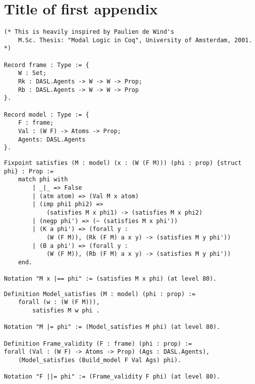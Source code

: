 \newpage
{}
\appendix

\chapter{Title of first appendix}
	\label{AP_01}

\begin{tcolorbox}
	\begin{lstlisting}[language=Coq]
(* This is heavily inspired by Paulien de Wind's 
	M.Sc. Thesis: "Modal Logic in Coq", University of Amsterdam, 2001.
*)
	
Record frame : Type := {
	W : Set;
	Rk : DASL.Agents -> W -> W -> Prop;
	Rb : DASL.Agents -> W -> W -> Prop
}.
	
Record model : Type := {
	F : frame;
	Val : (W F) -> Atoms -> Prop;
	Agents: DASL.Agents
}.
	\end{lstlisting}	

\end{tcolorbox}

\begin{tcolorbox}
	\begin{lstlisting}[language=Coq]
Fixpoint satisfies (M : model) (x : (W (F M))) (phi : prop) {struct phi} : Prop :=
	match phi with
		| _|_ => False
		| (atm atom) => (Val M x atom)
		| (imp phi1 phi2) => 
			(satisfies M x phi1) -> (satisfies M x phi2)
		| (negp phi') => (~ (satisfies M x phi'))
		| (K a phi') => (forall y : 
			(W (F M)), (Rk (F M) a x y) -> (satisfies M y phi'))
		| (B a phi') => (forall y :
			(W (F M)), (Rb (F M) a x y) -> (satisfies M y phi'))
	end.
		
Notation "M x |== phi" := (satisfies M x phi) (at level 80).
	\end{lstlisting}	

\end{tcolorbox}

\begin{tcolorbox}
\begin{lstlisting}[language=Coq]
Definition Model_satisfies (M : model) (phi : prop) := 
	forall (w : (W (F M))),
		satisfies M w phi .
		
Notation "M |= phi" := (Model_satisfies M phi) (at level 80).

Definition Frame_validity (F : frame) (phi : prop) := 
forall (Val : (W F) -> Atoms -> Prop) (Ags : DASL.Agents),
	(Model_satisfies (Build_model F Val Ags) phi).

Notation "F ||= phi" := (Frame_validity F phi) (at level 80).
	\end{lstlisting}	

\end{tcolorbox}

